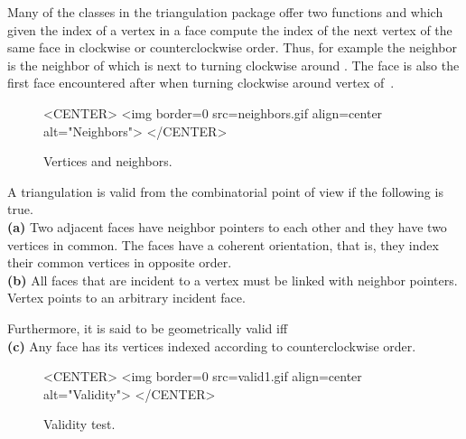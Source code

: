 Many of the classes in the triangulation package
offer  two functions  and 
which given the index of a vertex in a face
compute the index of the next vertex  of the same face
in clockwise
or counterclockwise order.
 Thus, for example the neighbor 
 is
 the
neighbor of   which is next to  turning clockwise
around . The face 
is also the first face encountered after  when
turning clockwise around vertex 
of~.



 \begin{figure}
\begin{ccTexOnly}
    \begin{center}
     
    \end{center}
\end{ccTexOnly} 
    \caption{Vertices and neighbors.
    \label{I1_Fig_neighbors}}
  \begin{ccHtmlOnly}
<CENTER>
<img border=0 src=neighbors.gif align=center alt="Neighbors">
</CENTER>
\end{ccHtmlOnly} 
\end{figure}



\smallskip
A triangulation is valid from the combinatorial point of view if the
following is true.
\\
{\bf (a)} Two adjacent faces have neighbor pointers to each 
other and they have two vertices in common. 
The faces have a
coherent orientation, that is, they index their common  vertices 
in opposite order.
\\
{\bf (b)} All faces that are incident to a vertex  
must be linked with neighbor pointers. Vertex  points to an 
arbitrary incident face. 

Furthermore, it is said to be geometrically valid iff
\\
{\bf (c)} Any face has its vertices indexed according to
counterclockwise order.

\smallskip
\begin{figure}
\begin{ccTexOnly}
\begin{center}  \end{center}
\end{ccTexOnly} 
\caption{Validity test.
\label{I1_Fig_valid}}

\begin{ccHtmlOnly}
<CENTER>
<img border=0 src=valid1.gif align=center alt="Validity">
</CENTER>
\end{ccHtmlOnly} 
\end{figure}



